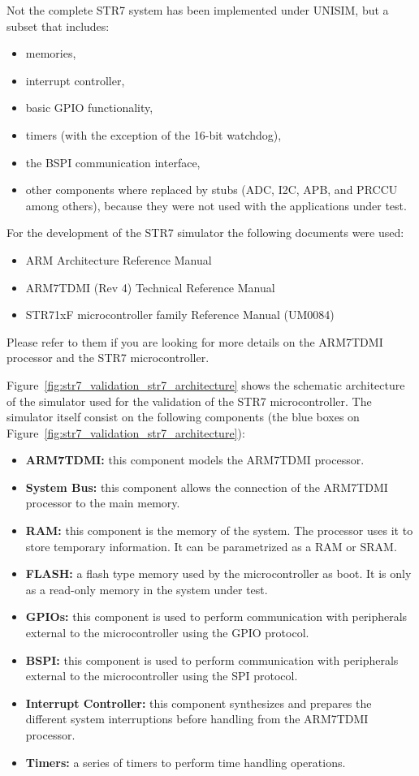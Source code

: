 Not the complete STR7 system has been implemented under UNISIM, but a subset that includes:
\begin{itemize}
	\item memories,
	\item interrupt controller,
	\item basic GPIO functionality,
	\item timers (with the exception of the 16-bit watchdog),
	\item the BSPI communication interface,
	\item other components where replaced by stubs (ADC, I2C, APB, and PRCCU among others), because they were not used with the applications under test.
\end{itemize}
For the development of the STR7 simulator the following documents were used:
\begin{itemize}
	\item ARM Architecture Reference Manual
	\item ARM7TDMI (Rev 4) Technical Reference Manual
	\item STR71xF microcontroller family Reference Manual (UM0084)
\end{itemize}
Please refer to them if you are looking for more details on the ARM7TDMI processor and the STR7 microcontroller.

Figure~\ref{fig:str7_validation_str7_architecture} shows the schematic architecture of the simulator used for the validation of the STR7 microcontroller.
The simulator itself consist on the following components (the blue boxes on Figure~\ref{fig:str7_validation_str7_architecture}):
\begin{itemize}
	\item \textbf{ARM7TDMI:} this component models the ARM7TDMI processor.
	\item \textbf{System Bus:} this component allows the connection of the ARM7TDMI processor to the main memory.
	\item \textbf{RAM:} this component is the memory of the system. The processor uses it to store temporary information. It can be parametrized as a RAM or SRAM.
	\item \textbf{FLASH:} a flash type memory used by the microcontroller as boot. It is only as a read-only memory in the system under test.
	\item \textbf{GPIOs:} this component is used to perform communication with peripherals external to the microcontroller using the GPIO protocol.
	\item \textbf{BSPI:} this component is used to perform communication with peripherals external to the microcontroller using the SPI protocol.
	\item \textbf{Interrupt Controller:} this component synthesizes and prepares the different system interruptions before handling from the ARM7TDMI processor.
	\item \textbf{Timers:} a series of timers to perform time handling operations.
\end{itemize}

